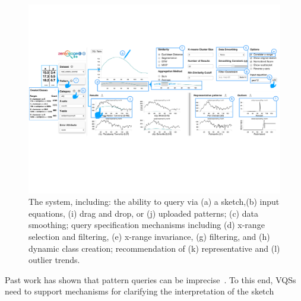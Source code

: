 \begin{figure}[ht!]
\centering
\vspace{-15pt}
\includegraphics[width=\linewidth]{figures/zvpp_system.pdf} %
\vspace{-5pt}\caption{The \zvpp system, including: the ability to query via (a) a sketch,(b) input equations, (i) drag and drop, or (j) uploaded patterns; (c) data smoothing; query specification mechanisms including (d) x-range selection and filtering, (e) x-range invariance, (g) filtering, and (h) dynamic class creation; recommendation of (k) representative and (l) outlier trends.} %
\label{zvOverview}
\vspace{-14pt}
\end{figure}
Past work has shown that pattern queries 
can be imprecise~\cite{correll2016semantics,Holz2009,Eichmann2015}. 
To this end, VQSs need to support mechanisms for 
clarifying the interpretation of the sketch 
